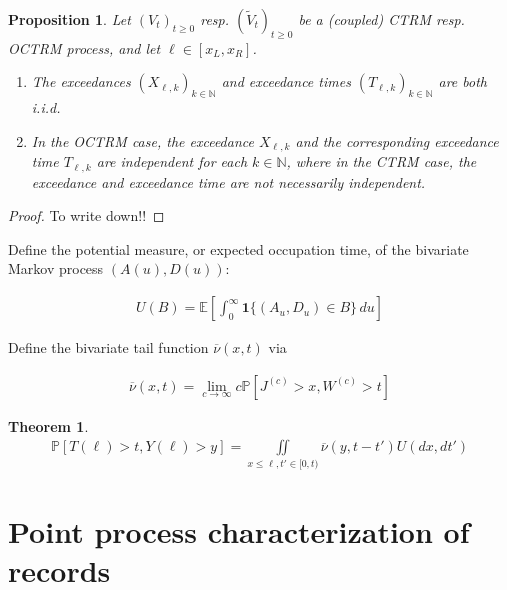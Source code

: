 \documentclass[12pt]{article}
\newtheorem{theorem}[equation]{Theorem}
\newtheorem{proposition}[equation]{Proposition}
\newcommand{\ex}{\mathbb {E}}
\newcommand{\pr}{\mathbb {P}}
\newcommand{\1}{\mathbf 1}
\begin{document}
\begin{proposition}\label{lem:independence}
	Let $(V_t)_{t \geq 0}$ resp. $(\tilde{V}_t)_{t \geq 0}$ be a (coupled) CTRM resp. OCTRM process, and let $\ell \in [x_L,x_R]$.
	\begin{enumerate}
		\item[(i)]
		The exceedances $(X_{\ell, k})_{k \in \mathbb N}$ and exceedance times 
		$(T_{\ell, k})_{k \in \mathbb N}$ are both i.i.d.
		\item[(ii)]
		In the OCTRM case, the exceedance $X_{\ell, k}$ and the corresponding exceedance time $T_{\ell, k}$ are independent for each $k \in \mathbb N$, where in the CTRM case, the exceedance and exceedance time are not necessarily independent. 
	\end{enumerate}
\end{proposition}\begin{proof}
	To write down!!
\end{proof}

Define the potential measure, or expected occupation time, of the bivariate 
Markov process $(A(u),D(u))$:

\begin{align*}
U(B) = \ex \left[ \int_0^\infty \mathbf 1\{ (A_u, D_u) \in B\}\,du \right]
\end{align*}

Define the bivariate tail function $\overline \nu(x,t)$ via 

\begin{align}
\overline \nu(x,t) = \lim_{c \to \infty} c \pr [J^{(c)} > x, W^{(c)} > t]
\end{align}


\begin{theorem}
\begin{align}
\pr [T(\ell) > t, Y(\ell) > y]
= \iint\limits_{x \le \ell, t' \in [0,t)} \overline \nu(y, t - t') U(dx, dt')
\end{align}
\end{theorem}


\section{Point process characterization of records}
\label{sec:records}
\end{document}
